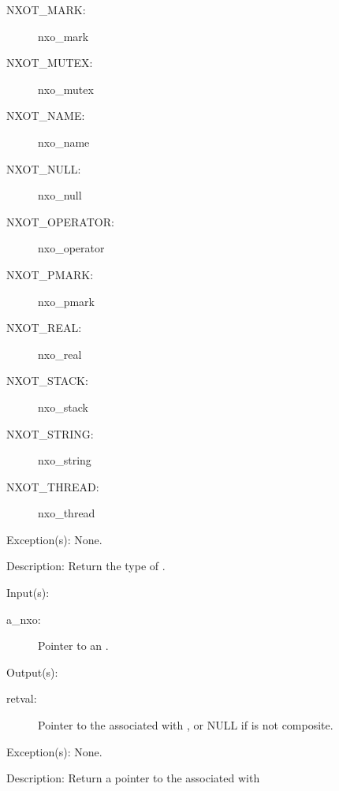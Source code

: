 \begin{capi}
\begin{capilist}
\begin{description}
\begin{description}
				\item[NXOT\_MARK: ]
					{nxo_mark}
				\item[NXOT\_MUTEX: ]
					{nxo_mutex}
				\item[NXOT\_NAME: ]
					{nxo_name}
				\item[NXOT\_NULL: ]
					{nxo_null}
				\item[NXOT\_OPERATOR: ]
					{nxo_operator}
				\item[NXOT\_PMARK: ]
					{nxo_pmark}
				\item[NXOT\_REAL: ]
					{nxo_real}
				\item[NXOT\_STACK: ]
					{nxo_stack}
				\item[NXOT\_STRING: ]
					{nxo_string}
				\item[NXOT\_THREAD: ]
					{nxo_thread}
			\end{description}
		\end{description}
	\item[Exception(s): ] None.
	\item[Description: ]
		Return the type of .
	\end{capilist}
\label{nxo_nxoe_get}
	\begin{capilist}
	\item[Input(s): ]
		\begin{description}\item[]
		\item[a\_nxo: ]
			Pointer to an .
		\end{description}
	\item[Output(s): ]
		\begin{description}\item[]
		\item[retval: ]
			Pointer to the  associated with
			, or NULL if  is not
			composite.
		\end{description}
	\item[Exception(s): ] None.
	\item[Description: ]
		Return a pointer to the  associated with

\end{capilist}
\end{capi}
